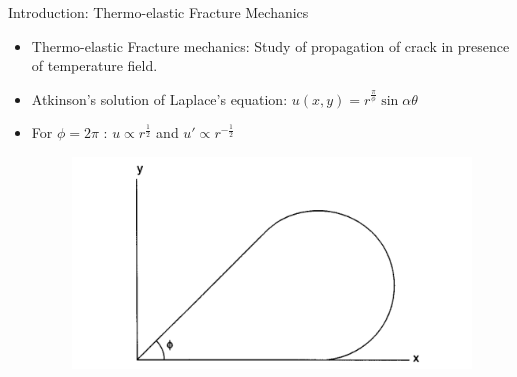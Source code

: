 \documentclass{beamer}
\begin{document}
\begin{frame}[t,fragile]{Introduction: Thermo-elastic Fracture Mechanics}
    \vspace{-.3cm}
    \scriptsize
    \begin{itemize}
         \item Thermo-elastic Fracture mechanics: Study of propagation of crack in presence of temperature field.
       \item Atkinson's solution of Laplace's equation: $u(x,y)= r^{\frac{\pi}{\phi}}\sin\alpha\theta$\\
     \item For $\phi=2\pi$ :  $u \propto r^{\frac{1}{2}}$ and $u'\propto  r^{-\frac{1}{2}}$  
        \begin{figure}
    \centering
    \vspace{-40pt}
    \hspace{7.5cm}\includegraphics[width=.2\textwidth]{pie.png}
\end{figure}


\end{itemize}
\end{frame}
\end{document}
